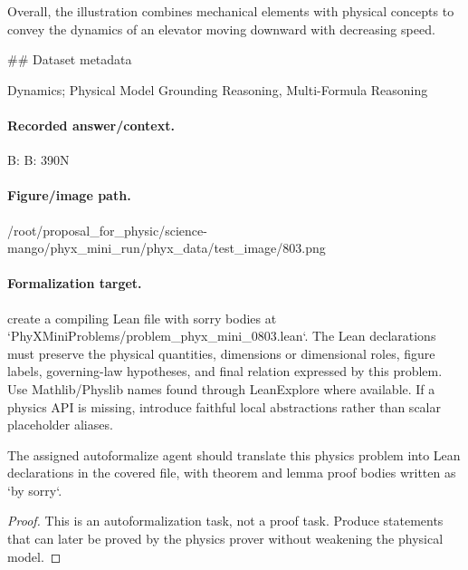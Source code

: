 Overall, the illustration combines mechanical elements with physical concepts to convey the dynamics of an elevator moving downward with decreasing speed.

\#\# Dataset metadata

Dynamics; Physical Model Grounding Reasoning, Multi-Formula Reasoning

\paragraph{Recorded answer/context.}
B: B: 390N

\paragraph{Figure/image path.}
/root/proposal\_for\_physic/science-mango/phyx\_mini\_run/phyx\_data/test\_image/803.png

\paragraph{Formalization target.}
create a compiling Lean file with sorry bodies at `PhyXMiniProblems/problem\_phyx\_mini\_0803.lean`. The Lean declarations must preserve the physical quantities, dimensions or dimensional roles, figure labels, governing-law hypotheses, and final relation expressed by this problem.
Use Mathlib/Physlib names found through LeanExplore where available. If a physics API is missing, introduce faithful local abstractions rather than scalar placeholder aliases.

\begin{theorem}
\label{thm:physics:phyx_mini_0803:target}
The assigned autoformalize agent should translate this physics problem into Lean declarations in the covered file, with theorem and lemma proof bodies written as `by sorry`.
\end{theorem}
\begin{proof}
This is an autoformalization task, not a proof task. Produce statements that can later be proved by the physics prover without weakening the physical model.
\end{proof}

